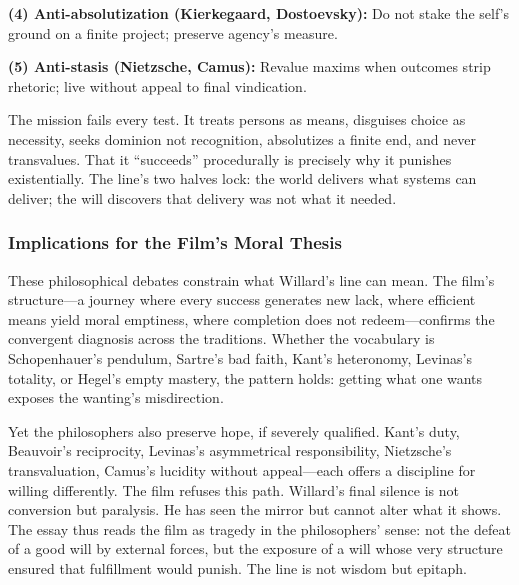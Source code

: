 \textbf{(4) Anti-absolutization (Kierkegaard, Dostoevsky):} Do not stake the self's ground on
a finite project; preserve agency's measure.

\textbf{(5) Anti-stasis (Nietzsche, Camus):} Revalue maxims when outcomes strip rhetoric; live
without appeal to final vindication.

The mission fails every test. It treats persons as means, disguises choice as necessity, seeks
dominion not recognition, absolutizes a finite end, and never transvalues. That it
``succeeds'' procedurally is precisely why it punishes existentially. The line's two halves
lock: the world delivers what systems can deliver; the will discovers that delivery was not
what it needed.

\subsubsection*{Implications for the Film's Moral Thesis}

These philosophical debates constrain what Willard's line can mean. The film's structure---a
journey where every success generates new lack, where efficient means yield moral emptiness,
where completion does not redeem---confirms the convergent diagnosis across the traditions.
Whether the vocabulary is Schopenhauer's pendulum, Sartre's bad faith, Kant's heteronomy,
Levinas's totality, or Hegel's empty mastery, the pattern holds: getting what one wants
exposes the wanting's misdirection.

Yet the philosophers also preserve hope, if severely qualified. Kant's duty, Beauvoir's
reciprocity, Levinas's asymmetrical responsibility, Nietzsche's transvaluation, Camus's
lucidity without appeal---each offers a discipline for willing differently. The film refuses
this path. Willard's final silence is not conversion but paralysis. He has seen the mirror but
cannot alter what it shows. The essay thus reads the film as tragedy in the philosophers'
sense: not the defeat of a good will by external forces, but the exposure of a will whose very
structure ensured that fulfillment would punish. The line is not wisdom but epitaph.
